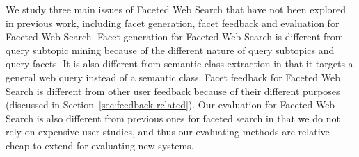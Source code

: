 We study three main issues of Faceted Web Search that have not been explored in previous work, including facet generation, facet feedback and evaluation for Faceted Web Search. Facet generation for Faceted Web Search is different from query subtopic mining because of the different nature of query subtopics and query facets. It is also different from semantic class extraction in that it targets a general web query instead of a semantic class. Facet feedback for Faceted Web Search is different from other user feedback because of their different purposes (discussed in Section~\ref{sec:feedback-related}). 
Our evaluation for Faceted Web Search is also different from previous ones for faceted search in that we do not rely on expensive user studies, and thus our evaluating methods are relative cheap to extend for evaluating new systems.